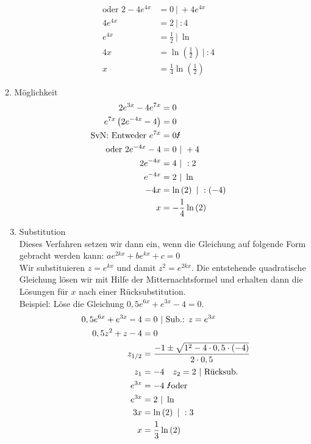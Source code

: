 \begin{enumerate}[label=\arabic*)]
\begin{minipage}{\textwidth}
\begin{minipage}[t]{0.49\textwidth}
{\begin{align*}
					\text{oder }2-4e^{4x}&=0\ \vert\ +4e^{4x}\\
					4e^{4x}&=2\ \vert\ :4\\
					e^{4x}&=\frac{1}{2}\ \vert\ \ln\\
					4x&=\ln\left(\tfrac{1}{2}\right)\ \vert\ :4\\
					x&=\frac{1}{4}\ln\left(\tfrac{1}{2}\right)
			\end{align*}}
		\end{minipage}
		\begin{minipage}[t]{0.49\textwidth}
			2. Möglichkeit
			\textcolor{loes}{\begin{align*}
					2e^{3x}-4e^{7x}&=0\\
					e^{7x}\left(2e^{-4x}-4\right) &=0\\
					\text{SvN: Entweder }e^{7x}&=0 \text{\Lightning}\\
					\text{oder }2e^{-4x}-4&=0\ \vert\ +4\\
					2e^{-4x}&=4\ \vert\ :2\\
					e^{-4x}&=2\ \vert\ \ln\\
					-4x&=\ln\left(2\right)\ \vert\ :(-4)\\
					x&=-\frac{1}{4}\ln\left(2\right)
			\end{align*}}
		\end{minipage}
	\end{minipage}
\end{enumerate}\newpage
\begin{enumerate}[label=\arabic*)]
	\setcounter{enumi}{2}
	\item Substitution\\
	Dieses Verfahren setzen wir dann ein, wenn die Gleichung auf folgende Form gebracht werden kann: \(ae^{2kx}+be^{kx}+c=0\)\\
	Wir substituieren \(z=e^{kx}\) und damit \(z^2=e^{2kx}\). Die entstehende quadratische Gleichung lösen wir mit Hilfe der Mitternachtsformel und erhalten dann die Lösungen für \(x\) nach einer Rücksubstitution.\\
	Beispiel: Löse die Gleichung \(0,5e^{6x}+e^{3x}-4=0\).
	\textcolor{loes}{\begin{align*}
			0,5e^{6x}+e^{3x}-4&=0\ \vert\ \text{Sub.: }z=e^{3x}\\
			0,5z^2+z-4&=0\\
			z_{1/2}&=\frac{-1\pm\sqrt{1^2-4\cdot 0,5\cdot \left(-4\right)}}{2\cdot 0,5}\\
			z_1&=-4\quad z_2=2\ \vert\ \text{Rücksub.}\\
			e^{3x}&=-4\text{ \Lightning\normalsize oder}\\
			e^{3x}&=2\ \vert\ \ln\\
			3x&=\ln\left(2\right)\ \vert\ :3\\
			x&=\frac{1}{3}\ln\left(2\right)
	\end{align*}}
\end{enumerate}
